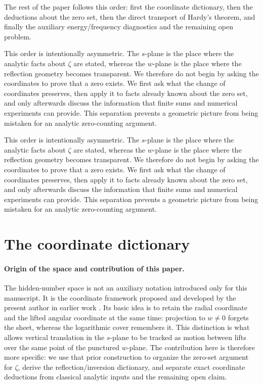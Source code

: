 \documentclass[submission,noinfoline]{jsfds}
\begin{document}
The rest of the paper follows this order: first the coordinate dictionary,
then the deductions about the zero set, then the direct transport of Hardy's
theorem, and finally the auxiliary energy/frequency diagnostics and the
remaining open problem.

This order is intentionally asymmetric. The $s$-plane is the place where
the analytic facts about $\zeta$ are stated, whereas the $w$-plane is the
place where the reflection geometry becomes transparent. We therefore do
not begin by asking the coordinates to prove that a zero exists. We first
ask what the change of coordinates preserves, then apply it to facts already
known about the zero set, and only afterwards discuss the information that
finite sums and numerical experiments can provide. This separation prevents
a geometric picture from being mistaken for an analytic zero-counting
argument.

This order is intentionally asymmetric. The $s$-plane is the place where
the analytic facts about $\zeta$ are stated, whereas the $w$-plane is the
place where the reflection geometry becomes transparent. We therefore do
not begin by asking the coordinates to prove that a zero exists. We first
ask what the change of coordinates preserves, then apply it to facts already
known about the zero set, and only afterwards discuss the information that
finite sums and numerical experiments can provide. This separation prevents
a geometric picture from being mistaken for an analytic zero-counting
argument.

\section{The coordinate dictionary}\label{sec:coords}

\paragraph{Origin of the space and contribution of this paper.}
The hidden-number space is not an auxiliary notation introduced only for
this manuscript. It is the coordinate framework proposed and developed by
the present author in earlier work \citep{LiuXu2026bridge}. Its basic idea
is to retain the radial coordinate and the lifted angular coordinate at the
same time: projection to $w\neq0$ forgets the sheet, whereas the logarithmic
cover remembers it. This distinction is what allows vertical translation in
the $s$-plane to be tracked as motion between lifts over the same point of
the punctured $w$-plane. The contribution here is therefore more specific:
we use that prior construction to organize the zero-set argument for
$\zeta$, derive the reflection/inversion dictionary, and separate exact
coordinate deductions from classical analytic inputs and the remaining open
claim.
\end{document}
